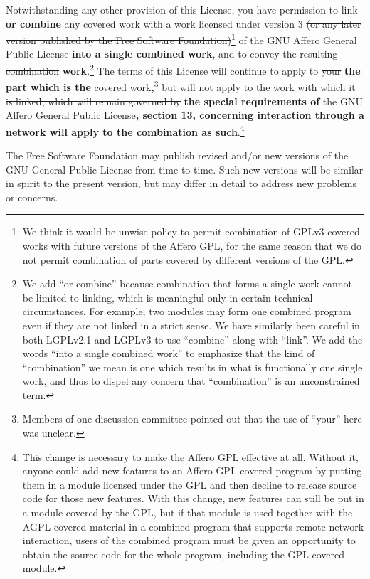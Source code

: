 \documentclass[11pt]{article}
\newcounter{v2section}
\newcounter{v3section}
\begin{document}
  Notwithstanding any other provision of this License, you have
permission to link \textbf{or combine} any covered work with a work
licensed under version 3 \sout{(or any later version published by the
Free Software Foundation)}\footnote{We think it would be unwise policy
to permit combination of GPLv3-covered works with future versions of the
Affero GPL, for the same reason that we do not permit combination of
parts covered by different versions of the GPL.} of the GNU Affero
General Public License \textbf{into a single combined work}, and to
convey the resulting \sout{combination} \textbf{work}.\footnote{We add
``or combine'' because combination that forms a single work cannot be
limited to linking, which is meaningful only in certain technical
circumstances.  For example, two modules may form one combined program
even if they are not linked in a strict sense.  We have similarly been
careful in both LGPLv2.1 and LGPLv3 to use ``combine'' along with
``link''.  We add the words ``into a single combined work'' to emphasize
that the kind of ``combination'' we mean is one which results in what is
functionally one single work, and thus to dispel any concern that
``combination'' is an unconstrained term.}  The terms of this License
will continue to apply to \sout{your} \textbf{the part which is the}
covered work\textbf{,}\footnote{Members of one discussion committee
pointed out that the use of ``your'' here was unclear.} but \sout{will
not apply to the work with which it is linked, which will remain
governed by} \textbf{the special requirements of} the GNU Affero General
Public License\textbf{, section 13, concerning interaction through a
network will apply to the combination as such}.\footnote{This change is
necessary to make the Affero GPL effective at all.  Without it, anyone
could add new features to an Affero GPL-covered program by putting them
in a module licensed under the GPL and then decline to release source
code for those new features.  With this change, new features can still
be put in a module covered by the GPL, but if that module is used
together with the AGPL-covered material in a combined program that
supports remote network interaction, users of the combined program must
be given an opportunity to obtain the source code for the whole program,
including the GPL-covered module.}

 

  The Free Software Foundation may publish revised and/or new versions
of the GNU General Public License from time to time.  Such new versions
will be similar in spirit to the present version, but may differ in
detail to address new problems or concerns.
\end{document}

